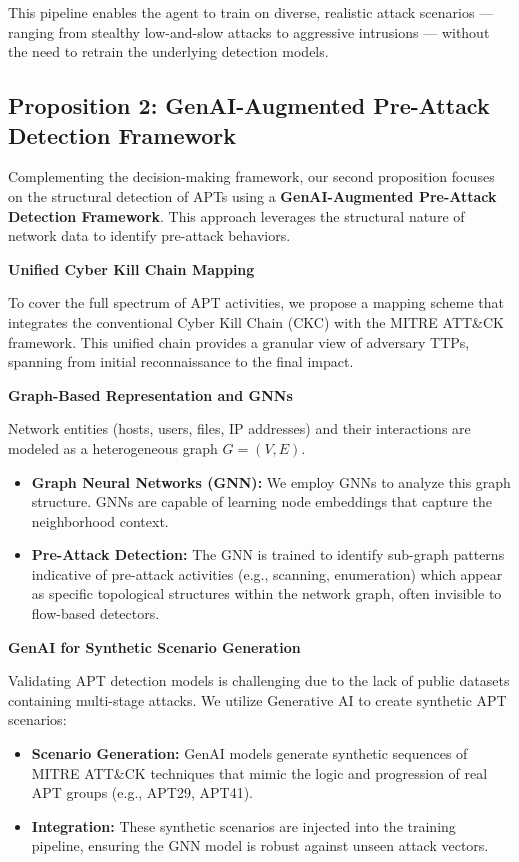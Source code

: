 This pipeline enables the agent to train on diverse, realistic attack scenarios — ranging from stealthy low-and-slow attacks to aggressive intrusions — without the need to retrain the underlying detection models.

\subsection{Proposition 2: GenAI-Augmented Pre-Attack Detection Framework}

Complementing the decision-making framework, our second proposition focuses on the structural detection of APTs using a \textbf{GenAI-Augmented Pre-Attack Detection Framework}. This approach leverages the structural nature of network data to identify pre-attack behaviors.

\textbf{Unified Cyber Kill Chain Mapping}

To cover the full spectrum of APT activities, we propose a mapping scheme that integrates the conventional Cyber Kill Chain (CKC) with the MITRE ATT\&CK framework. This unified chain provides a granular view of adversary TTPs, spanning from initial reconnaissance to the final impact.

\textbf{Graph-Based Representation and GNNs}

Network entities (hosts, users, files, IP addresses) and their interactions are modeled as a heterogeneous graph \(G = (V, E)\).

\begin{itemize}
\item \textbf{Graph Neural Networks (GNN):} We employ GNNs to analyze this graph structure. GNNs are capable of learning node embeddings that capture the neighborhood context.
\item \textbf{Pre-Attack Detection:} The GNN is trained to identify sub-graph patterns indicative of pre-attack activities (e.g., scanning, enumeration) which appear as specific topological structures within the network graph, often invisible to flow-based detectors.
\end{itemize}

\textbf{GenAI for Synthetic Scenario Generation}

Validating APT detection models is challenging due to the lack of public datasets containing multi-stage attacks. We utilize Generative AI to create synthetic APT scenarios:

\begin{itemize}
\item \textbf{Scenario Generation:} GenAI models generate synthetic sequences of MITRE ATT\&CK techniques that mimic the logic and progression of real APT groups (e.g., APT29, APT41).
\item \textbf{Integration:} These synthetic scenarios are injected into the training pipeline, ensuring the GNN model is robust against unseen attack vectors.
\end{itemize}

